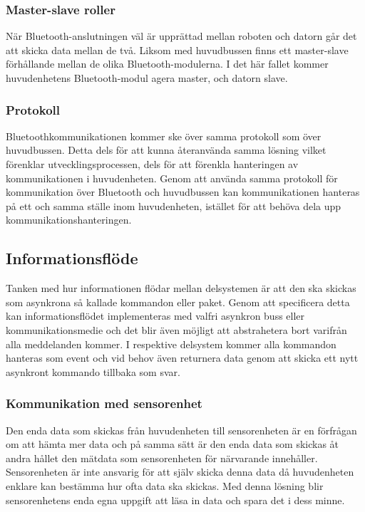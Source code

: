 \documentclass{article}
\begin{document}
\subsubsection{Master-slave roller}
När Bluetooth-anslutningen väl är upprättad mellan roboten och datorn går det att skicka data mellan de två. Liksom med huvudbussen finns ett master-slave förhållande mellan de olika Bluetooth-modulerna. I det här fallet kommer huvudenhetens Bluetooth-modul agera master, och datorn slave.

\subsubsection{Protokoll}
Bluetoothkommunikationen kommer ske över samma protokoll som över huvudbussen. Detta dels för att kunna återanvända samma lösning vilket förenklar utvecklingsprocessen, dels för att förenkla hanteringen av kommunikationen i huvudenheten. Genom att använda samma protokoll för kommunikation över Bluetooth och huvudbussen kan kommunikationen hanteras på ett och samma ställe inom huvudenheten, istället för att behöva dela upp kommunikationshanteringen.



\subsection{Informationsflöde}
Tanken med hur informationen flödar mellan delsystemen är att den ska skickas som asynkrona så kallade kommandon eller paket. Genom att specificera detta kan informationsflödet implementeras med valfri asynkron buss eller kommunikationsmedie och det blir även möjligt att abstrahetera bort varifrån alla meddelanden kommer. I respektive delsystem kommer alla kommandon hanteras som event och vid behov även returnera data genom att skicka ett nytt asynkront kommando tillbaka som svar.

\subsubsection{Kommunikation med sensorenhet}
Den enda data som skickas från huvudenheten till sensorenheten är en förfrågan om att hämta mer data och på samma sätt är den enda data som skickas åt andra hållet den mätdata som sensorenheten för närvarande innehåller. Sensorenheten är inte ansvarig för att själv skicka denna data då huvudenheten enklare kan bestämma hur ofta data ska skickas. Med denna lösning blir sensorenhetens enda egna uppgift att läsa in data och spara det i dess minne.
\end{document}
